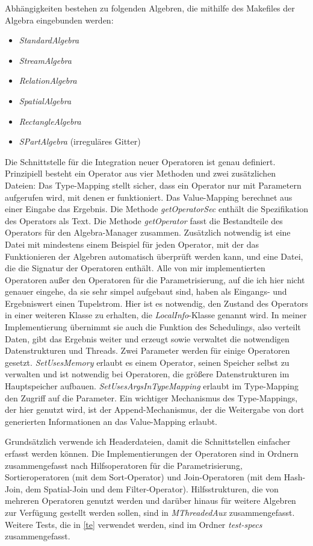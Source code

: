 \documentclass[a4paper,12pt,twoside]{article}
\newcommand{\Fb}[1]{\textit{#1}} %
\begin{document}
Abhängigkeiten bestehen zu folgenden Algebren, die mithilfe des Makefiles der Algebra eingebunden werden:

\begin{itemize}
	\item \Fb{StandardAlgebra}
	\item \Fb{StreamAlgebra}
	\item \Fb{RelationAlgebra}
	\item \Fb{SpatialAlgebra}
	\item \Fb{RectangleAlgebra}
	\item \Fb{SPartAlgebra} (irreguläres Gitter)
\end{itemize}

Die Schnittstelle für die Integration neuer Operatoren ist genau definiert. Prinzipiell besteht ein Operator aus vier Methoden und zwei zusätzlichen Dateien: Das Type-Mapping stellt sicher, dass ein Operator nur mit Parametern aufgerufen wird, mit denen er funktioniert. Das Value-Mapping berechnet aus einer Eingabe das Ergebnis. Die Methode \Fb{getOperatorSec} enthält die Spezifikation des Operators als Text. Die Methode \Fb{getOperator} fasst die Bestandteile des Operators für den Algebra-Manager zusammen. Zusätzlich notwendig ist eine Datei mit mindestens einem Beispiel für jeden Operator, mit der das Funktionieren der Algebren automatisch überprüft werden kann, und eine Datei, die die Signatur der Operatoren enthält. Alle von mir implementierten Operatoren außer den Operatoren für die Parametrisierung, auf die ich hier nicht genauer eingehe, da sie sehr simpel aufgebaut sind, haben als Eingangs- und Ergebniswert einen Tupelstrom. Hier ist es notwendig, den Zustand des Operators in einer weiteren Klasse zu erhalten, die \Fb{LocalInfo}-Klasse genannt wird. In meiner Implementierung übernimmt sie auch die Funktion des Schedulings, also verteilt Daten, gibt das Ergebnis weiter und erzeugt sowie verwaltet die notwendigen Datenstrukturen und Threads. Zwei Parameter werden für einige Operatoren gesetzt. \Fb{SetUsesMemory} erlaubt es einem Operator, seinen Speicher selbst zu verwalten und ist notwendig bei Operatoren, die größere Datenstrukturen im Hauptspeicher aufbauen. \Fb{SetUsesArgsInTypeMapping} erlaubt im Type-Mapping den Zugriff auf die Parameter. Ein wichtiger Mechanismus des Type-Mappings, der hier genutzt wird, ist der Append-Mechanismus, der die Weitergabe von dort generierten Informationen an das Value-Mapping erlaubt.

Grundsätzlich verwende ich Headerdateien, damit die Schnittstellen einfacher erfasst werden können. Die Implementierungen der Operatoren sind in Ordnern zusammengefasst nach Hilfsoperatoren für die Parametrisierung, Sortieroperatoren (mit dem Sort-Operator) und Join-Operatoren (mit dem Hash-Join, dem Spatial-Join und dem Filter-Operator). Hilfsstrukturen, die von mehreren Operatoren genutzt werden und darüber hinaus für weitere Algebren zur Verfügung gestellt werden sollen, sind in \Fb{MThreadedAux} zusammengefasst. Weitere Tests, die in \autoref{te} verwendet werden, sind im Ordner \Fb{test-specs} zusammengefasst.
\end{document}

